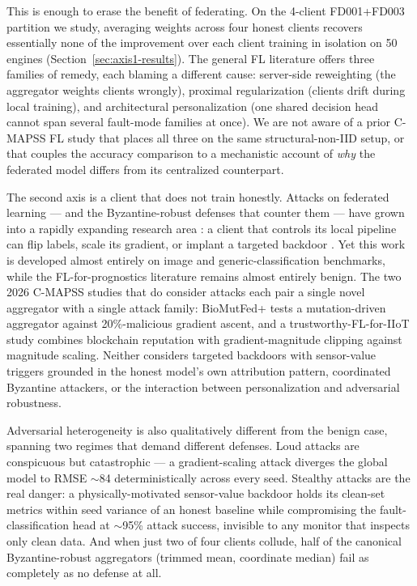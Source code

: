 \documentclass[a4paper,fleqn,doubleblind]{cas-sc}
\begin{document}
This is enough to erase the benefit of federating. On the 4-client
FD001+FD003 partition we study, averaging weights across four honest
clients recovers essentially none of the improvement over each
client training in isolation on 50 engines
(Section~\ref{sec:axis1-results}). The general FL literature offers
three families of remedy, each blaming a different cause:
server-side reweighting (the aggregator weights clients wrongly),
proximal regularization (clients drift during local training), and
architectural personalization (one shared decision head cannot span
several fault-mode families at once). We are not aware of a prior
C-MAPSS FL study that places all three on the same
structural-non-IID setup, or that couples the accuracy comparison to
a mechanistic account of \emph{why} the federated model differs from
its centralized counterpart.

The second axis is a client that does not train honestly. Attacks on
federated learning --- and the Byzantine-robust defenses that counter
them --- have grown into a rapidly expanding research area
\citep{Nguyen2024BackdoorSurvey}: a client that controls its local
pipeline can flip labels, scale its gradient, or implant a targeted
backdoor \citep{Bhagoji2019AdversarialLens,Bagdasaryan2020BackdoorFL,%
Xie2020DBA}. Yet this work is developed almost entirely on image and
generic-classification benchmarks, while the FL-for-prognostics
literature remains almost entirely benign. The two 2026 C-MAPSS studies that do
consider attacks each pair a single novel aggregator with a single
attack family: BioMutFed+ \citep{Tallat2026BioMutFedPlus} tests a
mutation-driven aggregator against 20\%-malicious gradient ascent,
and a trustworthy-FL-for-IIoT study \citep{Li2026TrustworthyFLIIoT}
combines blockchain reputation with gradient-magnitude clipping
against magnitude scaling. Neither considers targeted backdoors with
sensor-value triggers grounded in the honest model's own attribution
pattern, coordinated Byzantine attackers, or the interaction between
personalization and adversarial robustness.

Adversarial heterogeneity is also qualitatively different from the
benign case, spanning two regimes that demand different defenses.
Loud attacks are conspicuous but catastrophic --- a gradient-scaling
attack diverges the global model to RMSE $\sim$84 deterministically
across every seed. Stealthy attacks are the real danger: a
physically-motivated sensor-value backdoor holds its clean-set
metrics within seed variance of an honest baseline while
compromising the fault-classification head at $\sim$95\% attack
success, invisible to any monitor that inspects only clean data.
And when just two of four clients collude, half of the canonical
Byzantine-robust aggregators (trimmed mean, coordinate median) fail
as completely as no defense at all.
\end{document}
